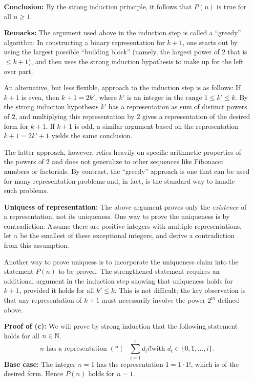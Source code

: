 \textbf{Conclusion:} By the strong induction principle, 
it follows that $P(n)$  is true for all $n\ge1$.

\bigskip

\textbf{Remarks:} The argument used above in the induction step is called a
``greedy'' algorithm: In constructing a binary representation for $k+1$, one
starts  out by using the largest possible ``building block'' (namely, the
largest power of $2$ that is $\le k+1$), and then uses the strong induction
hypothesis to make up for the left over part. 


An alternative, but less flexible, approach to the induction step is as
follows: If $k+1$ is even, then $k+1=2k'$, where $k'$ is an integer in
the range $1\le k'\le k$. By the strong induction hypothesis $k'$
has a representation as sum of distinct powers of $2$, and multiplying this
representation by $2$ gives a representation of the desired form for $k+1$. 
If $k+1$ is odd, a similar argument based on the representation $k+1=2k'+1$
yields the same conclusion. 

The latter approach, however, relies heavily on specific arithmetic properties
of the powers of $2$ and does not generalize to other sequences like Fibonacci
numbers or factorials. By contrast, the ``greedy'' approach is one that can be
used for many representation problems and, in fact, is the standard way to
handle such problems.

\bigskip

\textbf{Uniquess of representation:} The above argument proves only the
\emph{existence} of a representation, not its uniqueness.  One way to prove the
uniqueness is by contradiction: Assume there are positive integers with
multiple representations, let $n$  be the smallest of these exceptional
integers, and derive a contradiction from this assumption.

Another way to prove uniquess is to incorporate the uniqueness claim into the
statement $P(n)$ to be proved. The strengthened statement requires an additional
argument in the induction step showing that uniqueness holds for $k+1$,
provided it holds for all $k'\le k$. This is not difficult; the key observation
is that any representation of $k+1$ must necessarily involve the power $2^m$ 
defined above.

\textbf{Proof of (c):}
We will prove by strong induction that the following statement  
holds for all $n\in\mathbb{N}$.
\[
\text{$n$ has a representation 
$(*)$ $\sum_{i=1}^rd_ii!$
with $d_i\in\{0,1,\dots,i\}$.}
\tag{$P(n)$}
\]
\textbf{Base case:} The integer $n=1$ has the representation $1=1\cdot 1!$,
which is of the desired form. Hence $P(n)$ holds for $n=1$.


